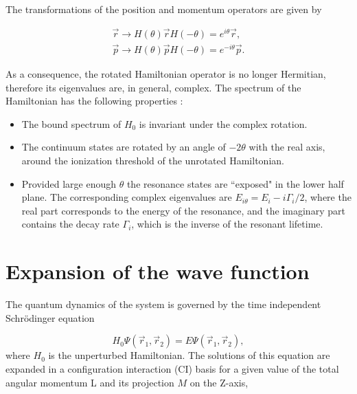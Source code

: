 The transformations of the position and momentum operators are given by

\begin{eqnarray}\label{key}
\vec{r} \rightarrow H(\theta)\vec{r}H(-\theta)=e^{i\theta}\vec{r},\\
\vec{p} \rightarrow H(\theta)\vec{p}H(-\theta)=e^{-i\theta}\vec{p}.
\end{eqnarray}

As a consequence, the rotated Hamiltonian operator is no longer Hermitian, therefore its eigenvalues are, in general, complex. The spectrum  of the Hamiltonian has the following properties \cite{reinhardt1982complex}:

\begin{itemize}
	\item The bound spectrum of $ H_{0} $ is invariant under the complex rotation.
	\item The continuum states are rotated by an angle of $ -2\theta $ with the real axis, around the ionization threshold of the unrotated Hamiltonian.
	\item Provided large enough $ \theta  $ the resonance states are ``exposed" in the lower half plane. The corresponding complex eigenvalues are $ E_{i\theta}=E_{i}-i\Gamma_{i}/2 $, where the real part corresponds to the energy of the resonance, and the imaginary part contains the decay rate $ \Gamma_{i} $, which is the inverse of the resonant lifetime.
	
\end{itemize}



\section{Expansion of the wave function}

The quantum dynamics of the system is governed by the time independent Schr\"odinger equation

\begin{equation}
H_{0}\Psi(\vec{r}_{1},\vec{r}_{2})=E\Psi(\vec{r}_{1},\vec{r}_{2}),
\end{equation}
where $ H_{0} $ is the unperturbed Hamiltonian. The solutions of this equation are expanded in a configuration interaction (CI) basis \cite{eiglsperger2009spectral,foumouo2006theory} for a given value of the total angular momentum L and its projection $ M $ on the Z-axis,

